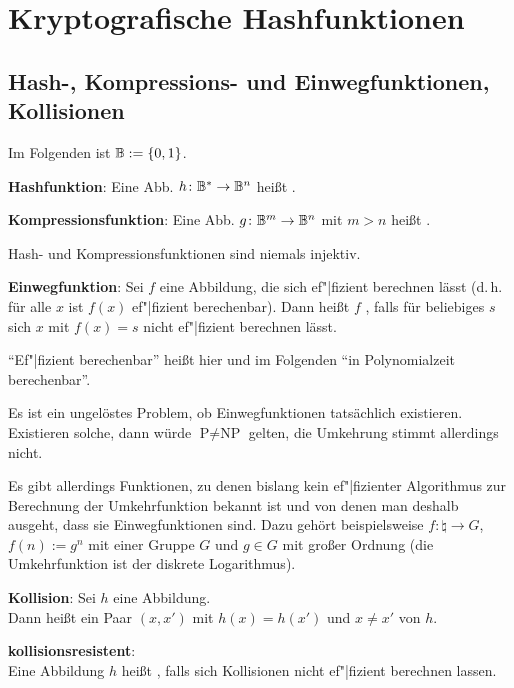 \chapter{%
    Kryptografische Hashfunktionen%
}

\section{%
    Hash-, Kompressions- und Einwegfunktionen, Kollisionen%
}

Im Folgenden ist $\mathbb{B} := \{0, 1\}$.

\textbf{Hashfunktion}:
Eine Abb. $h\colon \mathbb{B}^\ast \to \mathbb{B}^n$ heißt .

\textbf{Kompressionsfunktion}:
Eine Abb. $g\colon \mathbb{B}^m \to \mathbb{B}^n$ mit $m > n$ heißt .

Hash- und Kompressionsfunktionen sind niemals injektiv.

\linie

\textbf{Einwegfunktion}:
Sei $f$ eine Abbildung, die sich ef"|fizient berechnen lässt
(d.\,h. für alle $x$ ist $f(x)$ ef"|fizient berechenbar).
Dann heißt $f$ , falls für beliebiges $s$ sich $x$ mit $f(x) = s$
nicht ef"|fizient berechnen lässt.

"`Ef"|fizient berechenbar"' heißt hier und im Folgenden "`in Polynomialzeit berechenbar"'.

Es ist ein ungelöstes Problem, ob Einwegfunktionen tatsächlich existieren.
Existieren solche, dann würde $\text{P} \not= \text{NP}$ gelten,
die Umkehrung stimmt allerdings nicht.

Es gibt allerdings Funktionen, zu denen bislang kein ef"|fizienter Algorithmus zur Berechnung der
Umkehrfunktion bekannt ist und von denen man deshalb ausgeht, dass sie Einwegfunktionen sind.
Dazu gehört beispielsweise $f\colon \natural \to G$, $f(n) := g^n$ mit einer Gruppe $G$
und $g \in G$ mit großer Ordnung (die Umkehrfunktion ist der diskrete Logarithmus).

\linie

\textbf{Kollision}:
Sei $h$ eine Abbildung.\\
Dann heißt ein Paar $(x, x')$ mit $h(x) = h(x')$ und $x \not= x'$
 von $h$.

\textbf{kollisionsresistent}:\\
Eine Abbildung $h$ heißt , falls sich Kollisionen nicht ef"|fizient
berechnen lassen.


